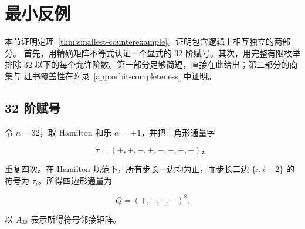 \section{最小反例}\label{sec:smallest-counterexample}

本节证明定理~\ref{thm:smallest-counterexample}。证明包含逻辑上相互独立的两部分。
首先，用精确矩阵不等式认证一个显式的 32 阶赋号。其次，用完整有限枚举排除
32 以下的每个允许阶数。第一部分足够简短，直接在此给出；第二部分的商集与
证书覆盖性在附录~\ref{app:orbit-completeness} 中证明。

\subsection{32 阶赋号}

令 \(n=32\)，取 Hamilton 和乐 \(\alpha=+1\)，并把三角形通量字

\begin{equation}
\label{eq:order-thirty-two-triangle-word}
\tau=(+,+,-,+,-,-,+,-)\text{，}
\end{equation}

重复四次。在 Hamilton 规范下，所有步长一边均为正，而步长二边
\(\{i,i+2\}\) 的符号为 \(\tau_i\)。所得四边形通量为

\begin{equation}
\label{eq:order-thirty-two-flux-word}
Q=(+,-,-,-)^{8}.
\end{equation}

以 \(A_{32}\) 表示所得符号邻接矩阵。

